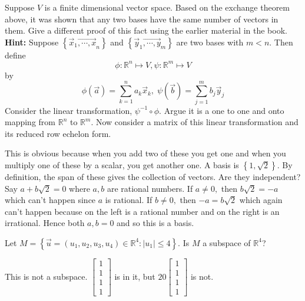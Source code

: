 \documentclass{ximera}
\begin{document}
\begin{problem}\label{prb:10.61} Suppose $V$ is a finite dimensional vector space. Based on the
exchange theorem above, it was shown that any two bases have the same number
of vectors in them. Give a different proof of this fact using the earlier
material in the book. \textbf{Hint: }Suppose $\left\{ \vec{x}_{1}\vec{
,\cdots ,x}_{n}\right\} $ and $\left\{ \vec{y}_{1}\vec{,\cdots ,y}
_{m}\right\} $ are two bases with $m<n.$ Then define
\begin{equation*}
\phi :\mathbb{R}^{n}\mapsto V,\psi :\mathbb{R}^{m}\mapsto V
\end{equation*}
by
\begin{equation*}
\phi \left( \vec{a}\right) = \sum_{k=1}^{n}a_{k}\vec{x}
_{k},\;\psi \left( \vec{b}\right) = \sum_{j=1}^{m}b_{j}\vec{y}_{j}
\end{equation*}
Consider the linear transformation, $\psi ^{-1}\circ \phi .$ Argue it is a
one to one and onto mapping from $\mathbb{R}^{n}$ to $\mathbb{R}^{m}.$ Now
consider a matrix of this linear transformation and its reduced row echelon form.
\begin{hint}
This is obvious because
when you add two of these you get one and when you multiply one of these by
a scalar, you get another one. A basis is $\left\{ 1,\sqrt{2}\right\} $. By
definition, the span of these gives the collection of vectors. Are they
independent? Say $a+b\sqrt{2}=0$ where $a,b$ are rational numbers. If $a\neq
0,$ then $b\sqrt{2}=-a$ which can't happen since $a$ is rational. If $b\neq
0,$ then $-a=b\sqrt{2}$ which again can't happen because on the left is a
rational number and on the right is an irrational. Hence both $a,b=0$ and so
this is a basis.
\end{hint}
\end{problem}

\begin{problem}\label{prb:10.62} Let $M=\left\{ \vec{u}=\left( u_{1},u_{2},u_{3},u_{4}\right) \in
\mathbb{R}^{4}:\left| u_{1}\right| \leq 4\right\} .$ Is $M$ a subspace of $\mathbb{R}^4$?
\begin{hint}
This is not a subspace. $\left[ \begin{array}{r}
1 \\
1 \\
1 \\
1
\end{array}
\right] $ is in
it, but $20\left[
\begin{array}{r}
1 \\
1 \\
1 \\
1
\end{array}
\right] $ is not.
\end{hint}
\end{problem}
\end{document}

